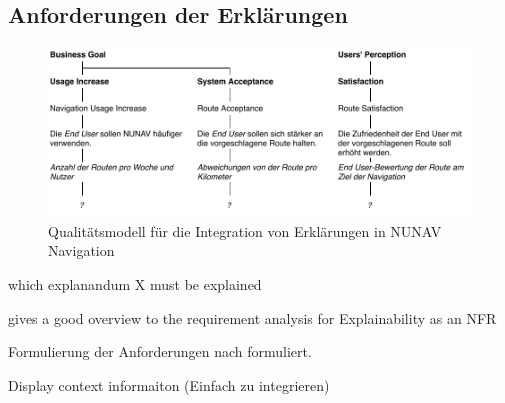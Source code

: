 \subsection{Anforderungen der Erklärungen}


\begin{figure}
    \centering
    \includegraphics{contents/06_model_evaluation/01_integration/res/quality_model.pdf}
    \caption{Qualitätsmodell für die Integration von Erklärungen in NUNAV Navigation}
    \label{fig:nunav_explanation_quality_model}
\end{figure}

which explanandum X must be explained \cite{kohl_explainability_2019}


\cite{golledge1999wayfinding}

\cite{bovy2012route}

\cite{kohl_explainability_2019} gives a good overview to the requirement analysis for Explainability as an NFR

Formulierung der Anforderungen nach \cite{rajnish2010quality, wiegers1999writing, alexander2002writing} formuliert.

Display context informaiton (Einfach zu integrieren) \cite{wiegand_id_2020}